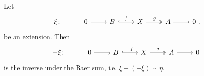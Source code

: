 \documentclass[main.tex]{subfiles}
\begin{document}
\begin{lemma}
  \label{lemma:baer_sum_preserves_inverses}
  Let
  \begin{equation*}
    \begin{tikzcd}
      \xi\colon
      & 0
      \arrow[r]
      & B
      \arrow[r, hook, "f"]
      & X
      \arrow[r, two heads, "g"]
      & A
      \arrow[r]
      & 0
    \end{tikzcd}.
  \end{equation*}
  be an extension. Then
  \begin{equation*}
    \begin{tikzcd}
      -\xi\colon
      & 0
      \arrow[r]
      & B
      \arrow[r, hook, "-f"]
      & X
      \arrow[r, two heads, "g"]
      & A
      \arrow[r]
      & 0
    \end{tikzcd}
  \end{equation*}
  is the inverse under the Baer sum, i.e. $\xi + (-\xi) \sim \eta$.
\end{lemma}
\end{document}
